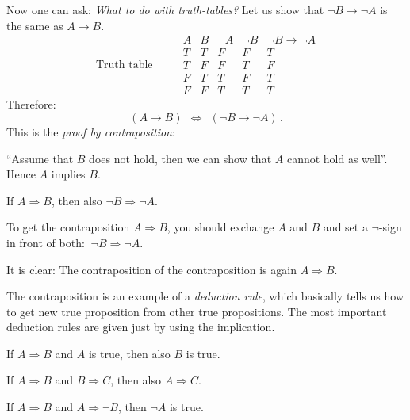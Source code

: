    
Now one can ask:
\emph{What to do with truth-tables?} 
Let us show that $\neg B \rightarrow \neg A$ is the same as $A \rightarrow B$.
   \begin{equation}
   \mbox{ Truth table }\qquad 
    \begin{array}{cc|cc|c}
     A & B &  \neg A & \neg B &\neg B \rightarrow \neg A \\ \hline
     T & T &   F & F & T\\
     T & F &   F & T & F\\
     F & T &   T & F & T\\
     F & F &   T & T & T
    \end{array}
   \end{equation}
Therefore:
	$$
		(A \rightarrow B) ~~ \Leftrightarrow
		~~
		(\neg B \rightarrow \neg A) \,.
	$$
This is the \emph{proof by contraposition}:


``Assume that $B$ does not hold, then we can show that $A$ cannot hold as well''. Hence $A$ implies $B$.
%
\begin{Boxx}[Contraposition]
If  $A \Rightarrow B$, then also $\neg B \Rightarrow \neg A$.
\end{Boxx}

\begin{Faust}[Contraposition]
To get the contraposition $A\Rightarrow B$, you should exchange $A$ and $B$ and set a $\neg$-sign in front of both:
$\ \neg B\Rightarrow\neg A$.

It is clear: The contraposition of the contraposition is again $A\Rightarrow B$.
\end{Faust}

The contraposition is an example of a \emph{deduction rule}, which basically
tells us how to get new true proposition from other true propositions. The most important deduction rules are given just by using the implication.

\begin{Boxx}
If $A \Rightarrow B$ and $A$ is true, then also $B$ is true.
\end{Boxx}

\begin{Boxx}
 If $A \Rightarrow B$ and $B \Rightarrow C$, then also $A \Rightarrow C$.
\end{Boxx}

\begin{Boxx}
 If $A \Rightarrow B$ and $A \Rightarrow \neg B$, then $\neg A$ is true.
\end{Boxx}

